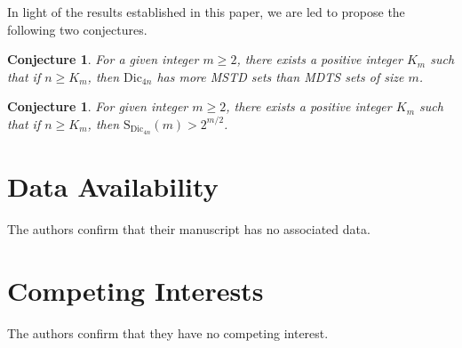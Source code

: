 \documentclass[11pt,reqno]{amsart}
\numberwithin{equation}{section}
\newtheorem{conjecture}[theorem]{Conjecture}
\begin{document}
In light of the results established in this paper, we are led to propose the following two conjectures.\begin{conjecture}
For a given integer $m\geq2$, there exists a positive integer $K_m$ such that if $n\geq K_m$, then $\mathrm{Dic}_{4n}$ has more MSTD sets than MDTS sets of size $m$.
\end{conjecture}
\begin{conjecture}
For given  integer $m\geq2$, there exists a positive integer $K_m$ such that if $n\geq K_m$, then $ \mathrm{S}_{\mathrm{Dic}_{4n}}(m)> 2^{m/2}$.
\end{conjecture}

\section{Data Availability} 	
The authors confirm that their manuscript has no associated data.

\section{Competing Interests}
The authors confirm that they have no competing interest. 
\end{document}
